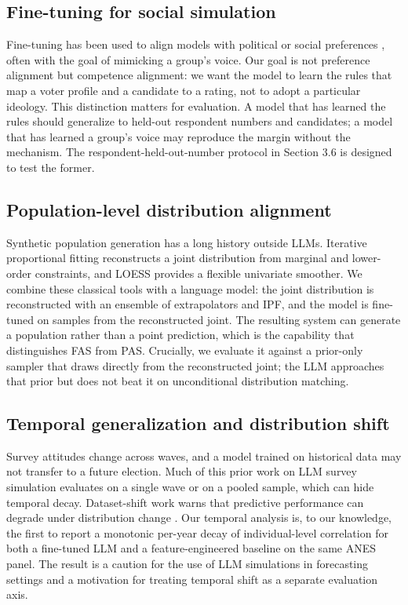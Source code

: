 \subsection{Fine-tuning for social
simulation}\label{fine-tuning-for-social-simulation}

Fine-tuning has been used to align models with political or social
preferences \citep{chu2023, zhao2023}, often with the goal of mimicking
a group's voice. Our goal is not preference alignment but competence
alignment: we want the model to learn the rules that map a voter profile
and a candidate to a rating, not to adopt a particular ideology. This
distinction matters for evaluation. A model that has learned the rules
should generalize to held-out respondent numbers and candidates; a model
that has learned a group's voice may reproduce the margin without the
mechanism. The respondent-held-out-number protocol in Section 3.6 is
designed to test the former.

\subsection{Population-level distribution
alignment}\label{population-level-distribution-alignment}

Synthetic population generation has a long history outside LLMs.
Iterative proportional fitting \citep{deming1940, fienberg1970}
reconstructs a joint distribution from marginal and lower-order
constraints, and LOESS \citep{cleveland1979} provides a flexible
univariate smoother. We combine these classical tools with a language
model: the joint distribution is reconstructed with an ensemble of
extrapolators and IPF, and the model is fine-tuned on samples from the
reconstructed joint. The resulting system can generate a population
rather than a point prediction, which is the capability that
distinguishes FAS from PAS. Crucially, we evaluate it against a
prior-only sampler that draws directly from the reconstructed joint; the
LLM approaches that prior but does not beat it on unconditional
distribution matching.

\subsection{Temporal generalization and distribution
shift}\label{temporal-generalization-and-distribution-shift}

Survey attitudes change across waves, and a model trained on historical
data may not transfer to a future election. Much of this prior work on
LLM survey simulation evaluates on a single wave or on a pooled sample,
which can hide temporal decay. Dataset-shift work warns that predictive
performance can degrade under distribution change
\citep{quinonero2009dataset, ovadia2019shift}. Our temporal analysis is,
to our knowledge, the first to report a monotonic per-year decay of
individual-level correlation for both a fine-tuned LLM and a
feature-engineered baseline on the same ANES panel. The result is a
caution for the use of LLM simulations in forecasting settings and a
motivation for treating temporal shift as a separate evaluation axis.

